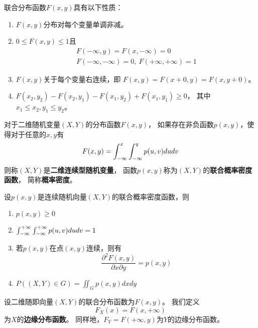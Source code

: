 \begin{theorem}[联合分布函数的性质]
  联合分布函数$F(x,y)$具有以下性质：
  \begin{enumerate}
    \item
    $F(x,y)$分布对每个变量单调非减。
    \item
    $0\le F(x,y)\le 1$且
    \begin{gather*}
    F(-\infty,y)=F(x,-\infty) = 0 \\
    F(-\infty,-\infty)=0,\ F(+\infty,+\infty)=1
    \end{gather*}
    \item
    $F(x,y)$关于每个变量右连续，即
    $F(x,y)=F(x+0,y)=F(x,y+0)$。
    \item
    $F(x_2,y_2)-F(x_2,y_1)-F(x_1,y_2)+F(x_1,y_1)\ge 0$，
    其中$x_1\le x_2, y_1 \le y_2$。
  \end{enumerate}
\end{theorem}

\begin{definition}[二维连续型随机变量与联合概率密度函数]
  对于二维随机变量$(X,Y)$的分布函数$F(x,y)$，
  如果存在非负函数$p(x,y)$，使得对于任意的$x,y$有
  \begin{displaymath}
  F(x,y)=\int_{-\infty}^{x}\int_{-\infty}^{y}p(u,v)dudv
  \end{displaymath}
  则称$(X,Y)$是\textbf{二维连续型随机变量}，
  函数$p(x,y)$称为$(X,Y)$的\textbf{联合概率密度函数}，
  简称\textbf{概率密度}。
\end{definition}

\begin{theorem}[联合概率密度函数的性质]
  设$p(x,y)$是连续随机向量$(X,Y)$的联合概率密度函数，则
  \begin{enumerate}
    \item
    $p(x,y)\ge 0$
    \item
    $\int_{-\infty}^{+\infty}\int_{-\infty}^{+\infty} p(u,v)dudv = 1$
    \item
    若$p(x,y)$在点$(x,y)$连续，则有
    \[ \frac{\partial^2 F(x,y)}{\partial x\partial y} = p(x,y) \]
    \item
    $P\left((X,Y)\in G\right) = \iint_G p(x,y)dxdy$
  \end{enumerate}
\end{theorem}

\begin{definition}[边缘分布函数]
  设二维随即向量$(X,Y)$的联合分布函数为$F(x,y)$。
  我们定义
  \begin{displaymath}
    F_X(x)=F(x,+\infty)
  \end{displaymath}
  为$X$的\textbf{边缘分布函数}。
  同样地，$F_Y=F(+\infty,y)$为$Y$的边缘分布函数。
\end{definition}

